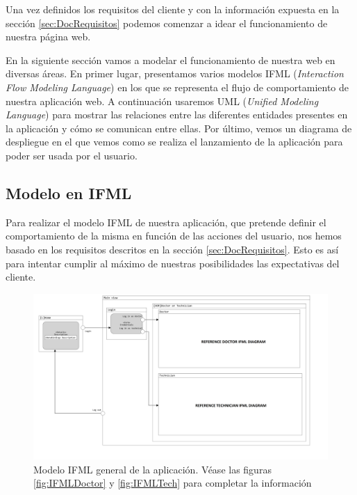 Una vez definidos los requisitos del cliente y con la información expuesta en la sección \ref{sec:DocRequisitos} podemos comenzar a idear el funcionamiento de nuestra página web.

En la siguiente sección vamos a modelar el funcionamiento de nuestra web en diversas áreas. En primer lugar, presentamos varios modelos IFML (\textit{Interaction Flow Modeling Language})\cite{IFML:Design} en los que se representa el flujo de comportamiento de nuestra aplicación web. A continuación usaremos UML (\textit{Unified Modeling Language})\cite{UMLWebsite} para mostrar las relaciones entre las diferentes entidades presentes en la aplicación y cómo se comunican entre ellas. Por último, vemos un diagrama de despliegue en el que vemos como se realiza el lanzamiento de la aplicación para poder ser usada por el usuario.

\subsection{Modelo en IFML}

Para realizar el modelo IFML de nuestra aplicación, que pretende definir el comportamiento de la misma en función de las acciones del usuario, nos hemos basado en los requisitos descritos en la sección \ref{sec:DocRequisitos}. Esto es así para intentar cumplir al máximo de nuestras posibilidades las expectativas del cliente.

\begin{figure}[H]
	\centering
	\includegraphics[width=\textwidth]{images/General-IFML.png}
	\caption{Modelo IFML general de la aplicación. Véase las figuras \ref{fig:IFMLDoctor} y \ref{fig:IFMLTech} para completar la información}
	\label{fig:IFMLModel}
\end{figure}

